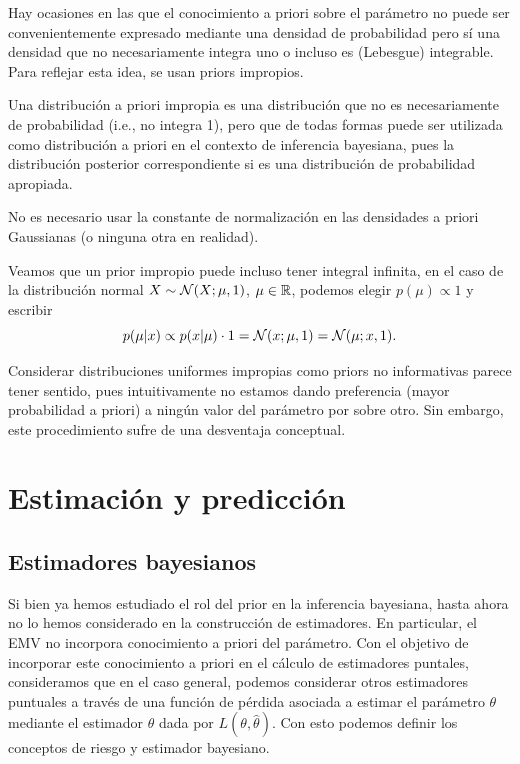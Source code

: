 Hay ocasiones en las que el conocimiento a priori sobre el parámetro no puede ser convenientemente expresado mediante una densidad de probabilidad pero sí una densidad que no necesariamente integra uno o incluso es (Lebesgue) integrable. Para reflejar esta idea, se usan priors impropios.

\begin{definition} Una distribución a priori impropia es una distribución que no es necesariamente de probabilidad (i.e., no integra 1), pero que de todas formas puede ser utilizada como distribución a priori en el contexto de inferencia bayesiana, pues la distribución posterior correspondiente si es una distribución de probabilidad apropiada. 
\end{definition}

\begin{remark} No es necesario usar la constante de normalización en las densidades a priori Gaussianas (o ninguna otra en realidad).
\end{remark}

\begin{remark} Veamos que un prior impropio puede incluso tener integral infinita, en el caso de la distribución normal $X\sim{\mathcal N}(X;\mu,1)$,  $\mu\in{\mathbb R}$, podemos elegir $p(\mu)\propto1$ y escribir 
\begin{equation}
	p(\mu|x)\propto p(x|\mu)\cdot 1 = {\mathcal N}(x;\mu,1) = {\mathcal N}(\mu;x,1). 
\end{equation}
	
\end{remark}

Considerar distribuciones uniformes impropias como priors no informativas parece tener sentido, pues intuitivamente no estamos dando preferencia (mayor probabilidad a priori) a ningún valor del parámetro por sobre otro. Sin embargo, este procedimiento sufre de una desventaja conceptual.




\section{Estimación y predicción}

\subsection{Estimadores bayesianos}

Si bien ya hemos estudiado el rol del prior en la inferencia bayesiana, hasta ahora no lo hemos considerado en la construcción de estimadores. En particular, el EMV no incorpora conocimiento a priori del parámetro. Con el objetivo de incorporar este conocimiento a priori en el cálculo de estimadores puntales, consideramos que en el caso general, podemos considerar otros estimadores puntuales a través de una función de pérdida asociada a estimar el parámetro $\theta$ mediante el estimador $\hat\theta$ dada por $L(\theta,\hat\theta)$. Con esto podemos definir los conceptos de riesgo y estimador bayesiano.


